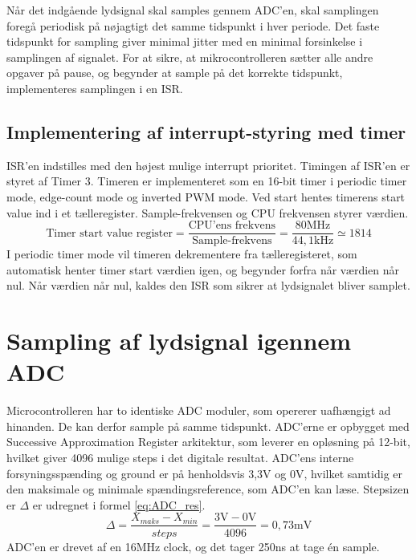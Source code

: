 Når det indgående lydsignal skal samples gennem ADC'en, skal samplingen foregå periodisk på nøjagtigt det samme tidspunkt i hver periode.
Det faste tidspunkt for sampling giver minimal jitter med en minimal forsinkelse i samplingen af signalet. 
For at sikre, at mikrocontrolleren sætter alle andre opgaver på pause, og begynder at sample på det korrekte tidspunkt, implementeres samplingen i en ISR.

\subsection{Implementering af interrupt-styring med timer}
\label{subsec:impl_int}
ISR'en indstilles med den højest mulige interrupt prioritet. 
Timingen af ISR'en er styret af Timer 3. 
Timeren er implementeret som en 16-bit timer i periodic timer mode, edge-count mode og inverted PWM mode.
Ved start hentes timerens start value ind i et tælleregister. 
Sample-frekvensen og CPU frekvensen styrer værdien. 
\begin{equation}
	\text{Timer start value register} = \frac{\text{CPU'ens frekvens}}{\text{Sample-frekvens}} = \frac{80\text{MHz}}{44,1\text{kHz}} \simeq 1814
\end{equation}
I periodic timer mode vil timeren dekrementere fra tælleregisteret, som automatisk henter timer start værdien igen, og begynder forfra når værdien når nul. 
Når værdien når nul, kaldes den ISR som sikrer at lydsignalet bliver samplet. \newline

\section{Sampling af lydsignal igennem ADC}\label{sec:ADC}
Microcontrolleren har to identiske ADC moduler, som opererer uafhængigt ad hinanden. 
De kan derfor sample på samme tidspunkt. 
ADC'erne er opbygget med Successive Approximation Register arkitektur, som leverer en opløsning på 12-bit, hvilket giver 4096 mulige steps i det digitale resultat. 
ADC'ens interne forsyningsspænding og ground er på henholdsvis 3,3V og 0V, hvilket samtidig er den maksimale og minimale spændingsreference, som ADC'en kan læse. 
Stepsizen er $\Delta$ er udregnet i formel \ref{eq:ADC_res}.
\begin{equation}
\label{eq:ADC_res}
	\Delta = \frac{X_{maks}-X_{min}}{steps} = \frac{3\text{V}-0\text{V}}{4096} = 0,73\text{mV}
\end{equation}
ADC'en er drevet af en 16MHz clock, og det tager 250ns at tage én sample. 

